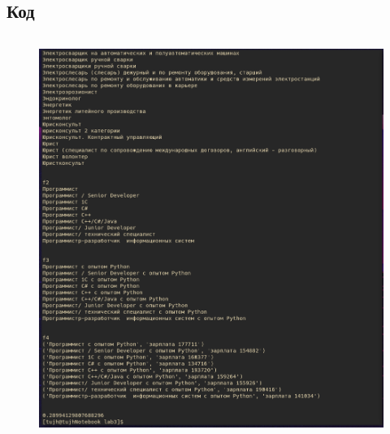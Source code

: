 \documentclass[20pt,a4paper]{report}
\begin{document}
		\subsection{Код}
			\small
			\inputminted[tabsize=4, linenos]{python}{process_data.py}
			\large

		\begin{figure}
				\includegraphics[width=\textwidth]{1.png}
		\end{figure}
\end{document}
